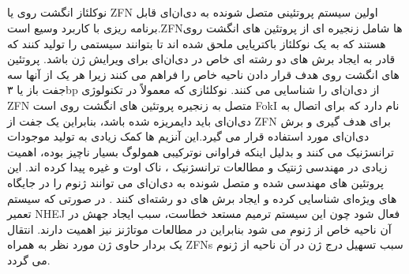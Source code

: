\documentclass[12pt,a4paper,BCOR=.7cm,headsepline,bibliography=totoc]{report}
\begin{document}
\subsection{}

نوکلئاز انگشت روی یا ZFN اولین سیستم پروتئینی متصل شونده به دی‌ان‌ای قابل برنامه ریزی با کاربرد وسیع است.ZFNها شامل زنجیره ای از پروتئین های انگشت روی هستند که به یک نوکلئاز باکتریایی ملحق شده اند تا بتوانند سیستمی را تولید کنند که قادر به ایجاد برش های دو رشته ای خاص در دی‌ان‌ای برای ویرایش ژن باشد. پروتئین های انگشت روی هدف قرار دادن ناحیه خاص را فراهم می کنند زیرا هر یک از آنها سه جفت باز یا ۳bp از دی‌ان‌ای را شناسایی می کنند. نوکلئازی که معمولاً در تکنولوژی ZFN متصل به زنجیره پروتئین های انگشت روی است FokI نام دارد که برای اتصال به دی‌ان‌ای باید دایمریزه شده باشد، بنابراین یک جفت از ZFN برای هدف گیری و برش دی‌ان‌ای مورد استفاده قرار می گیرد.این آنزیم ها کمک زیادی به تولید موجودات ترانسژنیک می کنند و بدلیل اینکه فراوانی نوترکیبی همولوگ بسیار ناچیز بوده، اهمیت زیادی در مهندسی ژنتیک و مطالعات ترانسژنیک ، ناک اوت و غیره پیدا کرده اند. این پروتئین های مهندسی شده و متصل شونده به دی‌ان‌ای می توانند ژنوم را در جایگاه های ویژه‌ای شناسایی کرده و ایجاد برش های دو رشته‌ای کنند . در صورتی که سیستم تعمير NHEJ فعال شود چون این سیستم ترمیم مستعد خطاست، سبب ایجاد جهش در آن ناحیه خاص از ژنوم می شود بنابراین در مطالعات موتاژنز نیز اهمیت دارند. انتقال یک بردار حاوی ژن مورد نظر به همراه ZFNs سبب تسهیل درج ژن در آن ناحیه از ژنوم می گردد.
\end{document}
